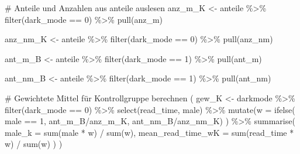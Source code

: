\documentclass[
  a4paper,
  DIV=11,
  oneside]{scrreprt}
\newenvironment{Shaded}{\begin{snugshade}}{\end{snugshade}}
\newcommand{\AttributeTok}[1]{\textcolor[rgb]{0.40,0.45,0.13}{#1}}
\newcommand{\CommentTok}[1]{\textcolor[rgb]{0.37,0.37,0.37}{#1}}
\newcommand{\DecValTok}[1]{\textcolor[rgb]{0.68,0.00,0.00}{#1}}
\newcommand{\FunctionTok}[1]{\textcolor[rgb]{0.28,0.35,0.67}{#1}}
\newcommand{\NormalTok}[1]{\textcolor[rgb]{0.00,0.23,0.31}{#1}}
\newcommand{\OtherTok}[1]{\textcolor[rgb]{0.00,0.23,0.31}{#1}}
\newcommand{\SpecialCharTok}[1]{\textcolor[rgb]{0.37,0.37,0.37}{#1}}
\begin{document}
\begin{Shaded}
\begin{Highlighting}[]
\CommentTok{\# Anteile und Anzahlen aus \textasciigrave{}anteile\textasciigrave{} auslesen}
\NormalTok{anz\_m\_K }\OtherTok{\textless{}{-}}\NormalTok{ anteile }\SpecialCharTok{\%\textgreater{}\%} 
  \FunctionTok{filter}\NormalTok{(dark\_mode }\SpecialCharTok{==} \DecValTok{0}\NormalTok{) }\SpecialCharTok{\%\textgreater{}\%} \FunctionTok{pull}\NormalTok{(anz\_m)}

\NormalTok{anz\_nm\_K }\OtherTok{\textless{}{-}}\NormalTok{ anteile }\SpecialCharTok{\%\textgreater{}\%} 
  \FunctionTok{filter}\NormalTok{(dark\_mode }\SpecialCharTok{==} \DecValTok{0}\NormalTok{) }\SpecialCharTok{\%\textgreater{}\%} \FunctionTok{pull}\NormalTok{(anz\_nm)}

\NormalTok{ant\_m\_B }\OtherTok{\textless{}{-}}\NormalTok{ anteile }\SpecialCharTok{\%\textgreater{}\%} 
  \FunctionTok{filter}\NormalTok{(dark\_mode }\SpecialCharTok{==} \DecValTok{1}\NormalTok{) }\SpecialCharTok{\%\textgreater{}\%} \FunctionTok{pull}\NormalTok{(ant\_m)}

\NormalTok{ant\_nm\_B }\OtherTok{\textless{}{-}}\NormalTok{ anteile }\SpecialCharTok{\%\textgreater{}\%} 
  \FunctionTok{filter}\NormalTok{(dark\_mode }\SpecialCharTok{==} \DecValTok{1}\NormalTok{) }\SpecialCharTok{\%\textgreater{}\%} \FunctionTok{pull}\NormalTok{(ant\_nm)}
\end{Highlighting}
\end{Shaded}

\begin{Shaded}
\begin{Highlighting}[]
\CommentTok{\# Gewichtete Mittel für Kontrollgruppe berechnen}
\NormalTok{(}
\NormalTok{gew\_K }\OtherTok{\textless{}{-}}\NormalTok{ darkmode }\SpecialCharTok{\%\textgreater{}\%} 
  \FunctionTok{filter}\NormalTok{(dark\_mode }\SpecialCharTok{==} \DecValTok{0}\NormalTok{) }\SpecialCharTok{\%\textgreater{}\%} 
  \FunctionTok{select}\NormalTok{(read\_time, male) }\SpecialCharTok{\%\textgreater{}\%}
  \FunctionTok{mutate}\NormalTok{(}\AttributeTok{w =} \FunctionTok{ifelse}\NormalTok{(}
\NormalTok{    male }\SpecialCharTok{==} \DecValTok{1}\NormalTok{, }
\NormalTok{    ant\_m\_B}\SpecialCharTok{/}\NormalTok{anz\_m\_K, }
\NormalTok{    ant\_nm\_B}\SpecialCharTok{/}\NormalTok{anz\_nm\_K)}
\NormalTok{    ) }\SpecialCharTok{\%\textgreater{}\%}
  \FunctionTok{summarise}\NormalTok{(}
    \AttributeTok{male\_k =} \FunctionTok{sum}\NormalTok{(male }\SpecialCharTok{*}\NormalTok{ w) }\SpecialCharTok{/} \FunctionTok{sum}\NormalTok{(w),}
    \AttributeTok{mean\_read\_time\_wK =} \FunctionTok{sum}\NormalTok{(read\_time }\SpecialCharTok{*}\NormalTok{ w) }\SpecialCharTok{/} \FunctionTok{sum}\NormalTok{(w)}
\NormalTok{  )}
\NormalTok{)}
\end{Highlighting}
\end{Shaded}
\end{document}
